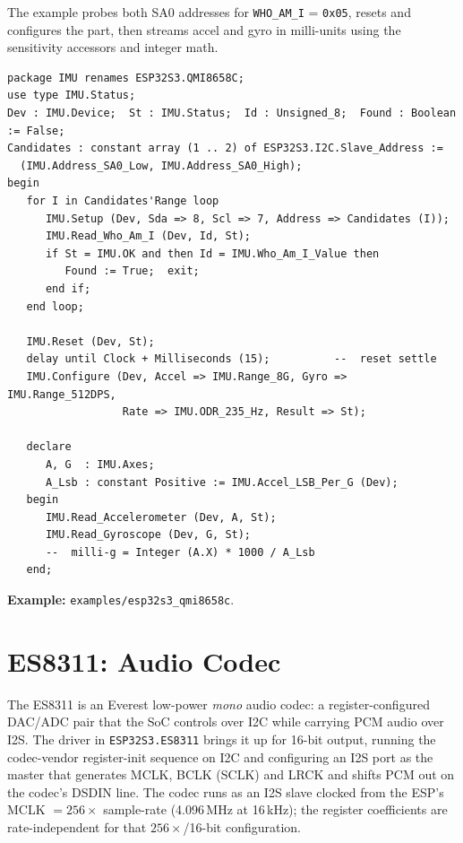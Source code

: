 The example probes both SA0 addresses for \texttt{WHO\_AM\_I} = \texttt{0x05},
resets and configures the part, then streams accel and gyro in milli-units using
the sensitivity accessors and integer math.

\begin{lstlisting}
package IMU renames ESP32S3.QMI8658C;
use type IMU.Status;
Dev : IMU.Device;  St : IMU.Status;  Id : Unsigned_8;  Found : Boolean := False;
Candidates : constant array (1 .. 2) of ESP32S3.I2C.Slave_Address :=
  (IMU.Address_SA0_Low, IMU.Address_SA0_High);
begin
   for I in Candidates'Range loop
      IMU.Setup (Dev, Sda => 8, Scl => 7, Address => Candidates (I));
      IMU.Read_Who_Am_I (Dev, Id, St);
      if St = IMU.OK and then Id = IMU.Who_Am_I_Value then
         Found := True;  exit;
      end if;
   end loop;

   IMU.Reset (Dev, St);
   delay until Clock + Milliseconds (15);          --  reset settle
   IMU.Configure (Dev, Accel => IMU.Range_8G, Gyro => IMU.Range_512DPS,
                  Rate => IMU.ODR_235_Hz, Result => St);

   declare
      A, G  : IMU.Axes;
      A_Lsb : constant Positive := IMU.Accel_LSB_Per_G (Dev);
   begin
      IMU.Read_Accelerometer (Dev, A, St);
      IMU.Read_Gyroscope (Dev, G, St);
      --  milli-g = Integer (A.X) * 1000 / A_Lsb
   end;
\end{lstlisting}

\noindent\textbf{Example:} \texttt{examples/esp32s3\_qmi8658c}.

\section{ES8311: Audio Codec}
\label{app:ext:es8311}

The ES8311 is an Everest low-power \emph{mono} audio codec: a register-configured
DAC/ADC pair that the SoC controls over I2C while carrying PCM audio over I2S. The
driver in \texttt{ESP32S3.ES8311} brings it up for 16-bit output, running the
codec-vendor register-init sequence on I2C and configuring an I2S port as the
master that generates MCLK, BCLK (SCLK) and LRCK and shifts PCM out on the codec's
DSDIN line. The codec runs as an I2S slave clocked from the ESP's MCLK $= 256
\times$ sample-rate (4.096\,MHz at 16\,kHz); the register coefficients are
rate-independent for that $256\times$/16-bit configuration.

